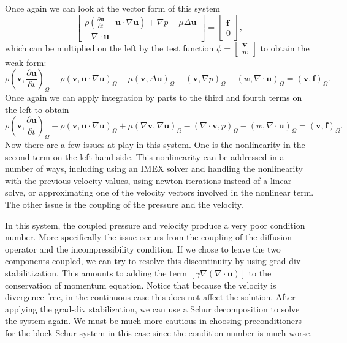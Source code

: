 \documentclass{article}
\begin{document}
    Once again we can look at the vector form of this system
    \[
        \begin{bmatrix} \rho \left(\frac{\partial \boldsymbol{u}}{\partial t} + \boldsymbol{u} \cdot \nabla \boldsymbol{u}\right) + \nabla p - \mu \Delta \boldsymbol{u} \\ -\nabla \cdot \boldsymbol{u} \end{bmatrix} = \begin{bmatrix} \boldsymbol{f} \\ 0 \end{bmatrix},
        \]
        which can be multiplied on the left by the test function $\phi = \begin{bmatrix}\boldsymbol{v} \\ w \end{bmatrix}$ to obtain the weak form:
            \[
        \rho\left(\boldsymbol{v},\frac{\partial \boldsymbol{u}}{\partial t} \right)_\Omega
        + \rho (\boldsymbol{v},\boldsymbol{u} \cdot \nabla \boldsymbol{u})_\Omega
        -\mu ( \boldsymbol{v}, \Delta \boldsymbol{u}) _\Omega 
        + ( \boldsymbol{v}, \nabla p) _\Omega
        - (w, \nabla \cdot \boldsymbol{u})_\Omega = (\boldsymbol{v},\boldsymbol{f})_\Omega.
    \]
    Once again we can apply integration by parts to the third and fourth terms on the left to obtain
        \[
        \rho\left(\boldsymbol{v},\frac{\partial \boldsymbol{u}}{\partial t} \right)_\Omega
        + \rho (\boldsymbol{v},\boldsymbol{u} \cdot \nabla \boldsymbol{u})_\Omega
        + \mu (\nabla \boldsymbol{v}, \nabla \boldsymbol{u}) _\Omega 
        - (\nabla \cdot \boldsymbol{v}, p) _\Omega
        - (w, \nabla \cdot \boldsymbol{u})_\Omega = (\boldsymbol{v},\boldsymbol{f})_\Omega.
    \]
    Now there are a few issues at play in this system. One is the nonlinearity in the second term on the left hand side. This nonlinearity can be addressed in a number of ways, including using an IMEX solver and handling the nonlinearity with the previous velocity values, using newton iterations instead of a linear solve, or approximating one of the velocity vectors involved in the nonlinear term. The other issue is the coupling of the pressure and the velocity. 

    In this system, the coupled pressure and velocity produce a very poor condition number. More specifically the issue occurs from the coupling of the diffusion operator and the incompressibility condition. If we chose to leave the two components coupled, we can try to resolve this discontinuity by using grad-div stabilitization. This amounts to adding the term $[\gamma \nabla (\nabla \cdot \boldsymbol{u})]$ to the conservation of momentum equation. Notice that because the velocity is divergence free, in the continuous case this does not affect the solution. After applying the grad-div stabilization, we can use a Schur decomposition to solve the system again. We must be much more cautious in choosing preconditioners for the block Schur system in this case since the condition number is much worse. 
   
\end{document}
